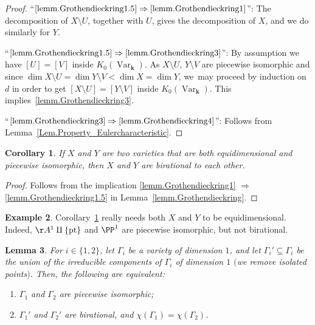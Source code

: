 \documentclass[JEP,XML,SOM,Unicode,NoFloatCountersInSection,published]{cedram}
\newtheorem{lemma}{Lemma}[section]
\newtheorem{corollary}[lemma]{Corollary}
\theoremstyle{definition}
\newtheorem{example}[lemma]{Example}
\renewcommand\k{{\mathbf k}}
\DeclareMathOperator{\Var}{Var}
\begin{document}
\begin{proof}
``$\eqref{lemm.Grothendieckring1.5}\Rightarrow \eqref{lemm.Grothendieckring1}$'': The decomposition of $X\setminus U$, together with $U$, gives the decomposition of $X$, and we do similarly for $Y$.

``$\eqref{lemm.Grothendieckring1.5}\Rightarrow \eqref{lemm.Grothendieckring3}$'':
By assumption we have $[U] = [V]$ inside $K_0(\Var_\k)$.
As $X \setminus U$, $Y \setminus V$ are piecewise isomorphic and since
$\dim X \setminus U = \dim Y \setminus V < \dim X = \dim Y$, we~may proceed by induction on $d$
in order to get $[X \setminus U] = [Y \setminus V]$ inside $K_0(\Var_\k)$. This implies~\eqref{lemm.Grothendieckring3}.

``$\eqref{lemm.Grothendieckring3}\Rightarrow\eqref{lemm.Grothendieckring4}$'': Follows from Lemma~\ref{Lem.Property_Eulercharacteristic}.
\end{proof}
\begin{corollary}\label{coro:Equidim}
If $X$ and $Y$ are two varieties that are both equidimensional and piecewise isomorphic, then $X$ and $Y$ are birational to each other.
\end{corollary}
\begin{proof}
Follows from the implication \eqref{lemm.Grothendieckring1} $\Rightarrow$ \eqref{lemm.Grothendieckring1.5}
in Lemma~\ref{lemm.Grothendieckring}.
\end{proof}\begin{example}
Corollary~\ref{coro:Equidim} really needs both $X$ and $Y$ to be equidimensional. Indeed, $\AA^1 \amalg \{\mathrm{pt}\}$ and $\PP^1$ are piecewise isomorphic, but not birational.
\end{example}

\begin{lemma}\label{CurvepiecewiseBir}
For $i\in \{1,2\}$, let $\Gamma_i$ be a variety of dimension $1$, and let $\Gamma_i'\subseteq \Gamma_i$ be the union of the irreducible components of $\Gamma_i$ of dimension $1$ $($we remove isolated points$)$. Then, the following are equivalent:
\begin{enumerate}
\item\label{CurvepiecewiseBir1}
$\Gamma_1$ and $\Gamma_2$ are piecewise isomorphic;
\item\label{CurvepiecewiseBir2}
$\Gamma_1'$ and $\Gamma_2'$ are birational, and $\chi(\Gamma_1)=\chi(\Gamma_2)$.
\end{enumerate}
\end{lemma}
\end{document}
